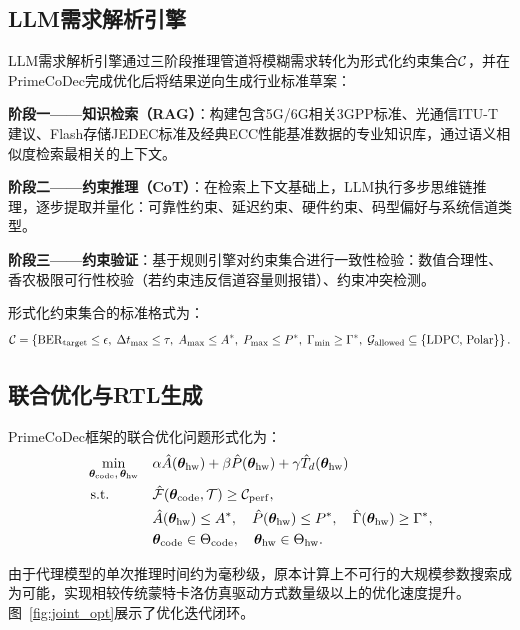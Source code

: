 \subsection{LLM需求解析引擎}\label{sec:llm_engine}

LLM需求解析引擎通过三阶段推理管道将模糊需求转化为形式化约束集合$\mathcal{C}$，并在PrimeCoDec完成优化后将结果逆向生成行业标准草案：

\textbf{阶段一——知识检索（RAG）}：构建包含5G/6G相关3GPP标准、光通信ITU-T建议、Flash存储JEDEC标准及经典ECC性能基准数据的专业知识库，通过语义相似度检索最相关的上下文。

\textbf{阶段二——约束推理（CoT）}：在检索上下文基础上，LLM执行多步思维链推理，逐步提取并量化：可靠性约束、延迟约束、硬件约束、码型偏好与系统信道类型。

\textbf{阶段三——约束验证}：基于规则引擎对约束集合进行一致性检验：数值合理性、香农极限可行性校验（若约束违反信道容量则报错）、约束冲突检测。

形式化约束集合的标准格式为：
\begin{equation}
  \mathcal{C} = \left\{
  \mathrm{BER}_{\mathrm{target}} \leq \epsilon,\;
  \Delta t_{\max} \leq \tau,\;
  A_{\max} \leq A^*,\;
  P_{\max} \leq P^*,\;
  \Gamma_{\min} \geq \Gamma^*,\;
  \mathcal{G}_{\mathrm{allowed}} \subseteq \{\text{LDPC, Polar}\}
  \right\}.
\end{equation}

\subsection{联合优化与RTL生成}\label{sec:optimizer}

PrimeCoDec框架的联合优化问题形式化为：
\begin{equation}
\begin{aligned}
  & \min_{\bm{\theta}_{\mathrm{code}},\,\bm{\theta}_{\mathrm{hw}}} && \alpha \hat{A}(\bm{\theta}_{\mathrm{hw}}) + \beta \hat{P}(\bm{\theta}_{\mathrm{hw}}) + \gamma \hat{T}_d(\bm{\theta}_{\mathrm{hw}})\\
  & \;\mathrm{s.t.}             && \hat{\mathcal{F}}(\bm{\theta}_{\mathrm{code}}, \mathcal{T}) \geq \mathcal{C}_{\mathrm{perf}},\\
  &                             && \hat{A}(\bm{\theta}_{\mathrm{hw}}) \leq A^*,\quad \hat{P}(\bm{\theta}_{\mathrm{hw}}) \leq P^*,\quad \hat{\Gamma}(\bm{\theta}_{\mathrm{hw}}) \geq \Gamma^*,\\
  &                             && \bm{\theta}_{\mathrm{code}} \in \Theta_{\mathrm{code}},\quad \bm{\theta}_{\mathrm{hw}} \in \Theta_{\mathrm{hw}}.
\end{aligned}
\label{eq:joint_opt}
\end{equation}

由于代理模型的单次推理时间约为毫秒级，原本计算上不可行的大规模参数搜索成为可能，实现相较传统蒙特卡洛仿真驱动方式数量级以上的优化速度提升。图~\ref{fig:joint_opt}展示了优化迭代闭环。

